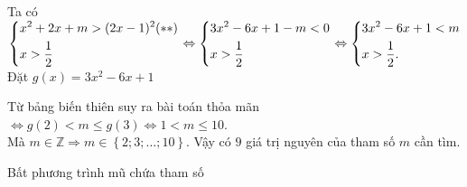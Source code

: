 \begin{ex}
{		Ta có $\left\{\begin{aligned}&x^2+2x+m>(2x-1)^2(**)\\&x>\dfrac{1}{2}\end{aligned}\right.\Leftrightarrow\left\{\begin{aligned}&3x^2-6x+1-m<0\\&x>\dfrac{1}{2}\end{aligned}\right.\Leftrightarrow\left\{\begin{aligned}&3x^2-6x+1<m\\&x>\dfrac{1}{2}.\end{aligned}\right.$ \\
		Đặt $g(x)=3x^2-6x+1$
		\begin{center}
		\end{center}
		Từ bảng biến thiên suy ra bài toán thỏa mãn $\Leftrightarrow g(2)<m\leq g(3)\Leftrightarrow 1<m\leq 10$.\\
		Mà $m\in\mathbb{Z}\Rightarrow m\in\left\{2; 3;\ldots;10\right\}$. Vậy có $9$ giá trị nguyên của tham số $m$ cần tìm.
	}
\end{ex}
\begin{dang}
	{Bất phương trình mũ chứa tham số}
\end{dang}      
